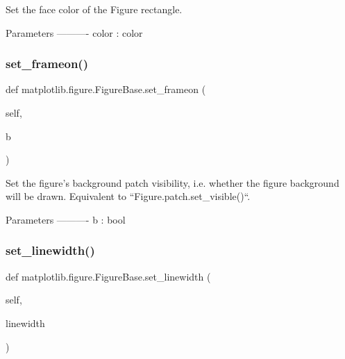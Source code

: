 \begin{DoxyVerb}
\begin{DoxyVerb}
\begin{DoxyVerb}Set the face color of the Figure rectangle.

Parameters
----------
color : color
\end{DoxyVerb}
 \mbox{\label{classmatplotlib_1_1figure_1_1FigureBase_a81c6cabb6943f6a78bf18c53d192bd7a}} 
\subsubsection{\texorpdfstring{set\+\_\+frameon()}{set\_frameon()}}
{\footnotesize\ttfamily def matplotlib.\+figure.\+Figure\+Base.\+set\+\_\+frameon (\begin{DoxyParamCaption}\item[{}]{self,  }\item[{}]{b }\end{DoxyParamCaption})}

\begin{DoxyVerb}Set the figure's background patch visibility, i.e.
whether the figure background will be drawn. Equivalent to
``Figure.patch.set_visible()``.

Parameters
----------
b : bool
\end{DoxyVerb}
 \mbox{\label{classmatplotlib_1_1figure_1_1FigureBase_a21f5fad0e2090950172ce9a05828e811}} 
\subsubsection{\texorpdfstring{set\+\_\+linewidth()}{set\_linewidth()}}
{\footnotesize\ttfamily def matplotlib.\+figure.\+Figure\+Base.\+set\+\_\+linewidth (\begin{DoxyParamCaption}\item[{}]{self,  }\item[{}]{linewidth }\end{DoxyParamCaption})}


\end{DoxyVerb}
\end{DoxyVerb}
